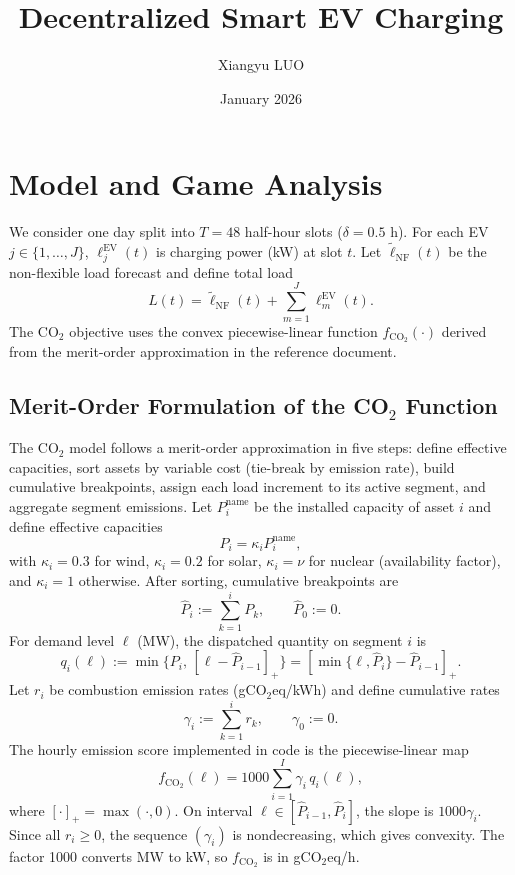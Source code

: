 \documentclass[11pt]{article}
\title{Decentralized Smart EV Charging}
\author{Xiangyu LUO}
\date{January 2026}
\begin{document}
\maketitle
\tableofcontents
\clearpage

\section{Model and Game Analysis}
\label{sec:model_game}

We consider one day split into $T=48$ half-hour slots ($\delta=0.5$ h). For each EV $j\in\{1,\dots,J\}$, $\ell^{\mathrm{EV}}_j(t)$ is charging power (kW) at slot $t$. Let $\tilde \ell_{\mathrm{NF}}(t)$ be the non-flexible load forecast and define total load
\[
L(t)=\tilde \ell_{\mathrm{NF}}(t)+\sum_{m=1}^J \ell^{\mathrm{EV}}_m(t).
\]
The CO$_2$ objective uses the convex piecewise-linear function $f_{\mathrm{CO}_2}(\cdot)$ derived from the merit-order approximation in the reference document.

\subsection{Merit-Order Formulation of the CO$_2$ Function}
\label{subsec:piecewise_design}

The CO$_2$ model follows a merit-order approximation in five steps: define effective capacities, sort assets by variable cost (tie-break by emission rate), build cumulative breakpoints, assign each load increment to its active segment, and aggregate segment emissions. Let $P_i^{\mathrm{name}}$ be the installed capacity of asset $i$ and define effective capacities
\[
P_i=\kappa_i P_i^{\mathrm{name}},
\]
with $\kappa_i=0.3$ for wind, $\kappa_i=0.2$ for solar, $\kappa_i=\nu$ for nuclear (availability factor), and $\kappa_i=1$ otherwise. After sorting, cumulative breakpoints are
\[
\hat P_i:=\sum_{k=1}^i P_k,\qquad \hat P_0:=0.
\]
For demand level $\ell$ (MW), the dispatched quantity on segment $i$ is
\[
q_i(\ell):=\min\{P_i,\,[\ell-\hat P_{i-1}]_+\}
=\left[\min\{\ell,\hat P_i\}-\hat P_{i-1}\right]_+.
\]
Let $r_i$ be combustion emission rates (gCO$_2$eq/kWh) and define cumulative rates
\[
\gamma_i:=\sum_{k=1}^i r_k,\qquad \gamma_0:=0.
\]
The hourly emission score implemented in code is the piecewise-linear map
\begin{equation}
\label{eq:fco2_piecewise}
f_{\mathrm{CO}_2}(\ell)
=1000\sum_{i=1}^{I}\gamma_i\,q_i(\ell),
\end{equation}
where $[\cdot]_+=\max(\cdot,0)$. On interval $\ell\in[\hat P_{i-1},\hat P_i]$, the slope is $1000\gamma_i$. Since all $r_i\ge 0$, the sequence $(\gamma_i)$ is nondecreasing, which gives convexity. The factor 1000 converts MW to kW, so $f_{\mathrm{CO}_2}$ is in gCO$_2$eq/h.
\end{document}
